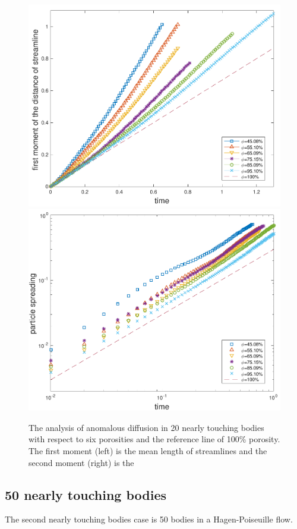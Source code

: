 \documentclass[preprint, 10pt]{elsarticle}
\begin{document}
\begin{figure}[H]
\includegraphics*[width =0.45\linewidth]{./figs/20b_first_moment}
\includegraphics*[width =0.45\linewidth]{./figs/20b_second_moment}
\caption{\label{fig:Eroding20anomalous} The analysis of anomalous diffusion in
 20 nearly touching bodies with respect to six porosities and the reference line of 100\% porosity.
The first moment (left) is the mean length of streamlines and the second moment (right) is the }
\end{figure}


\subsection{50 nearly touching bodies}
{\color{red}
The second nearly touching bodies case is 50 bodies in a Hagen-Poiseuille flow.
}

\end{document}
